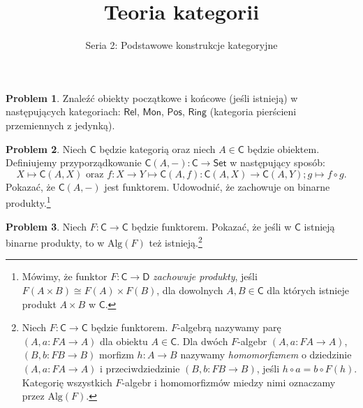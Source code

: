 \documentclass[10pt]{amsart}
\title{Teoria kategorii}
\author{Seria 2: Podstawowe konstrukcje kategoryjne}
\theoremstyle{plain}
\theoremstyle{definition}
\newtheorem{problem}{Problem}
\numberwithin{equation}{section}
\begin{document}
\maketitle
\thispagestyle{empty}

\begin{problem}
Znaleźć obiekty początkowe i końcowe (jeśli istnieją) w następujących kategoriach:
$\mathsf{Rel}$,  $\mathsf{Mon}$, $\mathsf{Pos}$, $\mathsf{Ring}$ (kategoria pierścieni przemiennych z jedynką). 
\end{problem}


\begin{problem}
Niech $\mathsf{C}$ będzie kategorią oraz niech $A\in \mathsf{C}$ będzie obiektem. Definiujemy przyporządkowanie $\mathsf{C}(A,-):\mathsf{C}\to \mathsf{Set}$ w następujący sposób:
$$
X\mapsto \mathsf{C}(A,X) \text{ oraz } f:X\to Y \mapsto \mathsf{C}(A,f):\mathsf{C}(A,X)\to \mathsf{C}(A,Y);g\mapsto f\circ g. 
$$
Pokazać, że $\mathsf{C}(A,-)$ jest funktorem. Udowodnić, że zachowuje on binarne produkty.\footnote{Mówimy, że funktor $F:\mathsf{C}\to\mathsf{D}$ \emph{zachowuje produkty}, jeśli $F(A\times B) \cong F(A)\times F(B)$, dla dowolnych $A,B\in \mathsf{C}$ dla których istnieje produkt $A\times B$ w $\mathsf{C}$.}
\end{problem}

\begin{problem}
    Niech $F:\mathsf{C}\to\mathsf{C}$ będzie funktorem. Pokazać, że jeśli w $\mathsf{C}$ istnieją binarne produkty, to w $\mathrm{Alg}(F)$ też istnieją.\footnote{Niech $F:\mathsf{C}\to \mathsf{C}$ będzie funktorem. $F$-algebrą nazywamy parę $(A,a:FA\to A)$ dla obiektu $A\in \mathsf{C}$. Dla dwóch $F$-algebr $(A,a:FA\to A)$, $(B,b:FB\to B)$ morfizm $h:A\to B$ nazywamy \emph{homomorfizmem} o dziedzinie $(A,a:FA\to A)$ i przeciwdziedzinie $(B,b:FB\to B)$, jeśli $h\circ a = b\circ F(h)$.  Kategorię wszystkich $F$-algebr i homomorfizmów miedzy nimi oznaczamy przez $\mathrm{Alg}(F).$} 
\end{problem}
\end{document}
